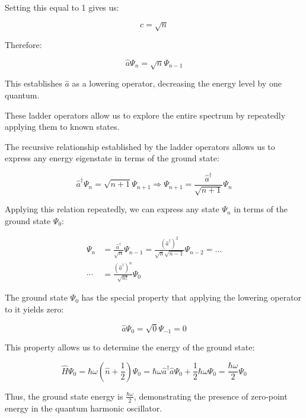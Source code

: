 Setting this equal to 1 gives us:

\begin{equation}
c = \sqrt{n}
\end{equation}

Therefore:

\begin{equation}
\hat{a}\Psi_n = \sqrt{n}\Psi_{n-1}
\end{equation}

This establishes $\hat{a}$ as a lowering operator, decreasing the energy level by one quantum.

These ladder operators allow us to explore the entire spectrum by repeatedly applying them to known states.


The recursive relationship established by the ladder operators allows us to express any energy eigenstate in terms of the ground state:

\begin{equation}
\hat{a}^\dagger\Psi_n = \sqrt{n+1}\Psi_{n+1} \Longrightarrow \Psi_{n+1} = \frac{\hat{a}^\dagger}{\sqrt{n+1}}\Psi_n
\end{equation}

Applying this relation repeatedly, we can express any state $\Psi_n$ in terms of the ground state $\Psi_0$:

\begin{align}
\Psi_n &= \frac{\hat{a}^\dagger}{\sqrt{n}}\Psi_{n-1} = \frac{(\hat{a}^\dagger)^2}{\sqrt{n}\sqrt{n-1}}\Psi_{n-2} = \ldots  \\
\cdots &= \frac{(\hat{a}^\dagger)^n}{\sqrt{n!}}\Psi_0
\end{align}

The ground state $\Psi_0$ has the special property that applying the lowering operator to it yields zero:

\begin{equation}
\hat{a}\Psi_0 = \sqrt{0}\Psi_{-1} = 0
\end{equation}

This property allows us to determine the energy of the ground state:

\begin{equation}
\hat{H}\Psi_0 = \hbar\omega\left(\hat{n}+\frac{1}{2}\right)\Psi_0 = \hbar\omega\hat{a}^\dagger\hat{a}\Psi_0 + \frac{1}{2}\hbar\omega\Psi_0 = \frac{\hbar\omega}{2}\Psi_0
\end{equation}

Thus, the ground state energy is $\frac{\hbar\omega}{2}$, demonstrating the presence of zero-point energy in the quantum harmonic oscillator.

